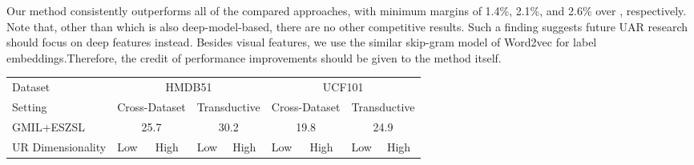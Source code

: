 \documentclass[10pt,twocolumn,letterpaper]{article}
\begin{document}
Our method consistently outperforms all of the compared approaches, with minimum margins of 1.4\%, 2.1\%, and 2.6\% over \cite{2017_ICCV_Spatial_aware}, respectively. Note that, other than \cite{2015_ICCV_ZSL_detection} which is also deep-model-based, there are no other competitive results. Such a finding suggests future UAR research should focus on deep features instead. Besides visual features, we use the similar skip-gram model of Word2vec for label embeddings.Therefore, the credit of performance improvements should be given to the method itself.

\begin{table*}[]
	\centering
	\begin{tabular}{l|ll|ll|ll|ll}
		\Xhline{1pt}
		Dataset           & \multicolumn{4}{c|}{HMDB51}                                           & \multicolumn{4}{c}{UCF101}                                           \\
		Setting           & \multicolumn{2}{l}{Cross-Dataset} & \multicolumn{2}{c|}{Transductive} & \multicolumn{2}{l}{Cross-Dataset} & \multicolumn{2}{c}{Transductive} \\
		
		\hline 
		
		GMIL+ESZSL\cite{2015_embarrassingly}        & \multicolumn{2}{c|}{25.7}          & \multicolumn{2}{c|}{30.2}         & \multicolumn{2}{c|}{19.8}          & \multicolumn{2}{c}{24.9}         \\
		
		\hline
		
		UR Dimensionality & Low              & High           & Low             & High           & Low              & High           & Low             & High           \\
		
		\hline
		

\end{tabular}
\end{table*}
\end{document}
